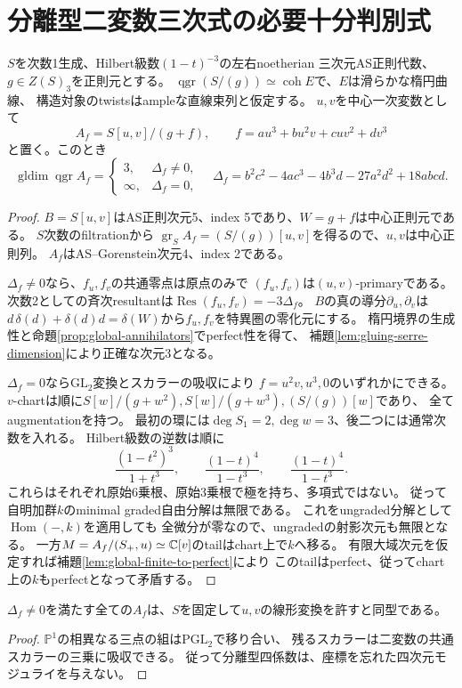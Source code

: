 \section{分離型二変数三次式の必要十分判別式}
\label{sec:quotient-separated-discriminant}
\begin{theorem}[分離族の正則性と二変数三次判別式]
\label{thm:global-separated}
$S$を次数1生成、Hilbert級数$(1-t)^{-3}$の左右noetherian
三次元AS正則代数、$g\in Z(S)_3$を正則元とする。
$\operatorname{qgr}(S/(g))\simeq\operatorname{coh}E$で、$E$は滑らかな楕円曲線、
構造対象のtwistsはampleな直線束列と仮定する。
$u,v$を中心一次変数として
\[
 A_f=S[u,v]/(g+f),\qquad f=au^3+bu^2v+cuv^2+dv^3
\]
と置く。このとき
\[
 \operatorname{gldim}\operatorname{qgr}A_f
 =\begin{cases}3,&\Delta_f\ne0,\\\infty,&\Delta_f=0,\end{cases}
\quad
 \Delta_f=b^2c^2-4ac^3-4b^3d-27a^2d^2+18abcd.
\]
\end{theorem}
\begin{proof}
$B=S[u,v]$はAS正則次元5、index 5であり、$W=g+f$は中心正則元である。
$S$次数のfiltrationから
$\operatorname{gr}_S A_f=(S/(g))[u,v]$を得るので、$u,v$は中心正則列。
$A_f$はAS--Gorenstein次元4、index 2である。

$\Delta_f\ne0$なら、$f_u,f_v$の共通零点は原点のみで
$(f_u,f_v)$は$(u,v)$-primaryである。
次数2としての斉次resultantは$\operatorname{Res}(f_u,f_v)=-3\Delta_f$。
$B$の真の導分$\partial_u,\partial_v$は
$d\,\delta(d)+\delta(d)d=\delta(W)$から$f_u,f_v$を特異圏の零化元にする。
楕円境界の生成性と命題\ref{prop:global-annihilators}でperfect性を得て、
補題\ref{lem:gluing-serre-dimension}により正確な次元3となる。

$\Delta_f=0$なら$\mathrm{GL}_2$変換とスカラーの吸収により
$f=u^2v,u^3,0$のいずれかにできる。
$v$-chartは順に$S[w]/(g+w^2),S[w]/(g+w^3),(S/(g))[w]$であり、
全てaugmentationを持つ。
最初の環には$\deg S_1=2,\deg w=3$、後二つには通常次数を入れる。
Hilbert級数の逆数は順に
\[
 \frac{(1-t^2)^3}{1+t^3},\qquad
 \frac{(1-t)^4}{1-t^3},\qquad
 \frac{(1-t)^4}{1-t^3}.
\]
これらはそれぞれ原始6乗根、原始3乗根で極を持ち、多項式ではない。
従って自明加群$k$のminimal graded自由分解は無限である。
これをungraded分解として$\operatorname{Hom}(-,k)$を適用しても
全微分が零なので、ungradedの射影次元も無限となる。
一方$M=A_f/(S_+,u)\simeq\mathbb C[v]$のtailはchart上で$k$へ移る。
有限大域次元を仮定すれば補題\ref{lem:global-finite-to-perfect}により
このtailはperfect、従ってchart上の$k$もperfectとなって矛盾する。
\end{proof}
\begin{corollary}[分離族の四係数と同型類]
$\Delta_f\ne0$を満たす全ての$A_f$は、$S$を固定して$u,v$の線形変換を許すと同型である。
\end{corollary}
\begin{proof}
$\mathbb P^1$の相異なる三点の組は$\mathrm{PGL}_2$で移り合い、
残るスカラーは二変数の共通スカラーの三乗に吸収できる。
従って分離型四係数は、座標を忘れた四次元モジュライを与えない。
\end{proof}

